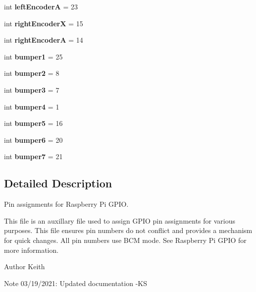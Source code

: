 \begin{DoxyCompactItemize}
int {\bfseries left\+EncoderA} = 23
\item 
\mbox{\label{namespacemcs_1_1pinAssignments_a92f95ff0c441e8a90534a5eba7cd7320}} 
int {\bfseries right\+EncoderX} = 15
\item 
\mbox{\label{namespacemcs_1_1pinAssignments_a4c1bc5100c6a55d4523798339e29fdf7}} 
int {\bfseries right\+EncoderA} = 14
\item 
\mbox{\label{namespacemcs_1_1pinAssignments_a6196793d43fa627df427fa4e15c3da0a}} 
int {\bfseries bumper1} = 25
\item 
\mbox{\label{namespacemcs_1_1pinAssignments_a3564fcc8b95e8911c4be9633f5c5dbf1}} 
int {\bfseries bumper2} = 8
\item 
\mbox{\label{namespacemcs_1_1pinAssignments_a55106aa5b98787c0f678488cc5694ee7}} 
int {\bfseries bumper3} = 7
\item 
\mbox{\label{namespacemcs_1_1pinAssignments_aa328fed0f965c36cbf00b1fb414a15c9}} 
int {\bfseries bumper4} = 1
\item 
\mbox{\label{namespacemcs_1_1pinAssignments_a17ed72f8c2e85fda15ba41e7d73fd0d4}} 
int {\bfseries bumper5} = 16
\item 
\mbox{\label{namespacemcs_1_1pinAssignments_ad203df240e7d41ab6b9d74dedeee1792}} 
int {\bfseries bumper6} = 20
\item 
\mbox{\label{namespacemcs_1_1pinAssignments_a75d00020de75bb6b988ba361d3f0a7bf}} 
int {\bfseries bumper7} = 21
\end{DoxyCompactItemize}


\subsection{Detailed Description}
Pin assignments for Raspberry Pi G\+P\+IO. 

This file is an auxillary file used to assign G\+P\+IO pin assignments for various purposes. This file ensures pin numbers do not conflict and provides a mechanism for quick changes. All pin numbers use B\+CM mode. See Raspberry Pi G\+P\+IO for more information. \begin{DoxyAuthor}{Author}
Keith 
\end{DoxyAuthor}
\begin{DoxyNote}{Note}
03/19/2021\+: Updated documentation -\/\+KS 
\end{DoxyNote}
